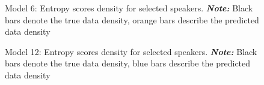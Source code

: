 \documentclass[
  authoryear,
  preprint,
  1p]{elsarticle}
\begin{document}
\label{cell-fig-rq3-pred-speaker_model06}
\begin{figure}[H]


\caption{\label{fig-rq3-pred-speaker_model06}Model 6: Entropy scores
density for selected speakers. \textbf{\emph{Note:}} Black bars denote
the true data density, orange bars describe the predicted data density}

\end{figure}%

\label{cell-fig-rq3-pred-speaker_model12}
\begin{figure}[H]


\caption{\label{fig-rq3-pred-speaker_model12}Model 12: Entropy scores
density for selected speakers. \textbf{\emph{Note:}} Black bars denote
the true data density, blue bars describe the predicted data density}

\end{figure}%
\end{document}
